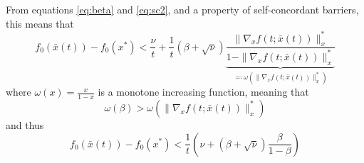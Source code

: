 \documentclass[12pt, openany]{report}
\theoremstyle{definition}
\begin{document}
From equations \eqref{eq:beta} and \eqref{eq:sc2}, and a property of self-concordant barriers, this means that 
\begin{equation}
	f_0(\bar x(t)) - f_0(x^*) < \frac{\nu}{t} + \frac{1}{t}(\beta +\sqrt{\nu}) \underbrace{\frac{\|\nabla_xf(t;\bar x(t))\|_x^*}{1-\|\nabla_xf(t;\bar x(t))\|_x^*}}_{\eqqcolon \omega(\|\nabla_xf(t;\bar x(t))\|_x^*)}
\end{equation}
where $\omega(x) = \frac{x}{1-x}$ is a monotone increasing function, meaning that 
\begin{equation}
	\omega(\beta) > \omega(\|\nabla_xf(t;\bar x(t))\|_x^*)
\end{equation}
and thus 
\begin{equation}\label{eq:bounding}
	f_0(\bar x(t)) - f_0(x^*) < \frac{1}{t}\left(\nu + (\beta +\sqrt{\nu}) \frac{\beta}{1-\beta}\right)
\end{equation}
\end{document}
